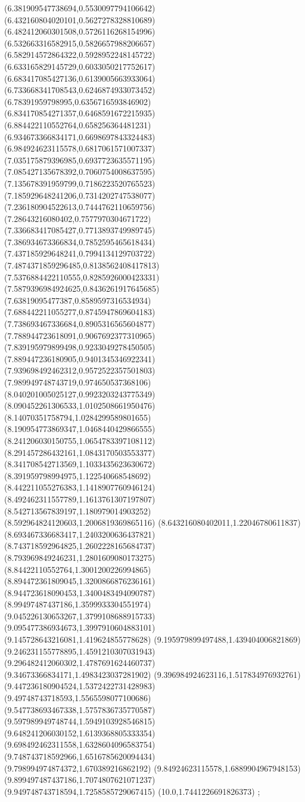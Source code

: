 {(6.381909547738694,0.5530097794106642)
(6.432160804020101,0.5627278328810689)
(6.482412060301508,0.5726116268154996)
(6.532663316582915,0.5826657988206657)
(6.582914572864322,0.5928952248145722)
(6.633165829145729,0.6033050217752617)
(6.683417085427136,0.6139005663933064)
(6.733668341708543,0.6246874933073452)
(6.78391959798995,0.6356716593846902)
(6.834170854271357,0.6468591672215935)
(6.884422110552764,0.658256364481231)
(6.934673366834171,0.6698697843324483)
(6.984924623115578,0.6817061571007337)
(7.035175879396985,0.6937723635571195)
(7.085427135678392,0.7060754008637595)
(7.135678391959799,0.7186223520765523)
(7.185929648241206,0.7314202747538077)
(7.236180904522613,0.7444762110659756)
(7.28643216080402,0.7577970304671722)
(7.336683417085427,0.7713893749989745)
(7.386934673366834,0.7852595465618434)
(7.437185929648241,0.7994134129703722)
(7.4874371859296485,0.8138562408417813)
(7.5376884422110555,0.8285926000423331)
(7.5879396984924625,0.8436261917645685)
(7.63819095477387,0.8589597316534934)
(7.688442211055277,0.8745947869604183)
(7.738693467336684,0.8905316565604877)
(7.788944723618091,0.9067692377310965)
(7.839195979899498,0.9233049278450505)
(7.889447236180905,0.9401345346922341)
(7.939698492462312,0.9572522357501803)
(7.989949748743719,0.974650537368106)
(8.040201005025127,0.9923203243775349)
(8.090452261306533,1.0102508661950476)
(8.14070351758794,1.0284299589801655)
(8.190954773869347,1.0468440429866555)
(8.241206030150755,1.0654783397108112)
(8.291457286432161,1.0843170503553377)
(8.341708542713569,1.1033435623630672)
(8.391959798994975,1.122540668548692)
(8.442211055276383,1.1418907760946124)
(8.492462311557789,1.1613761307197807)
(8.542713567839197,1.180979014903252)
(8.592964824120603,1.2006819369865116)
(8.643216080402011,1.22046780611837)
(8.693467336683417,1.2403200636437821)
(8.743718592964825,1.2602228165684737)
(8.793969849246231,1.2801609080173275)
(8.84422110552764,1.3001200226994865)
(8.894472361809045,1.3200866876236161)
(8.944723618090453,1.3400483494090787)
(8.99497487437186,1.3599933304551974)
(9.045226130653267,1.3799108688915733)
(9.095477386934673,1.3997910604883101)
(9.145728643216081,1.419624855778628)
(9.195979899497488,1.439404006821869)
(9.246231155778895,1.4591210307031943)
(9.296482412060302,1.4787691624460737)
(9.34673366834171,1.4983423037281902)
(9.396984924623116,1.517834976932761)
(9.447236180904524,1.5372422731428983)
(9.49748743718593,1.5565598077100686)
(9.547738693467338,1.5757836735770587)
(9.597989949748744,1.5949103928546815)
(9.648241206030152,1.6139368805333354)
(9.698492462311558,1.6328604096583754)
(9.748743718592966,1.6516785620094434)
(9.798994974874372,1.670389216862192)
(9.84924623115578,1.6889904967948153)
(9.899497487437186,1.7074807621071237)
(9.949748743718594,1.7258585729067415)
(10.0,1.7441226691826373)
};
